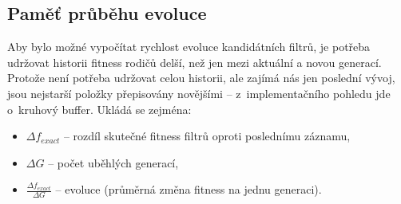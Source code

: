 




\subsection{Paměť průběhu evoluce}

Aby bylo možné vypočítat rychlost evoluce kandidátních filtrů, je potřeba udržovat historii fitness rodičů delší, než jen mezi aktuální a novou generací. Protože není potřeba udržovat celou historii, ale zajímá nás jen poslední vývoj, jsou nejstarší položky přepisovány novějšími -- z~implementačního pohledu jde o~kruhový buffer. Ukládá se zejména:

\begin{itemize}
    \item $\Delta{}f_{\mathit{exact}}$ -- rozdíl skutečné fitness filtrů oproti poslednímu záznamu,
    \item $\Delta{}G$ -- počet uběhlých generací,
    \item $\frac{\Delta{}f_{\mathit{exact}}}{\Delta{}G}$ --  evoluce (průměrná změna fitness na jednu generaci).
\end{itemize}

